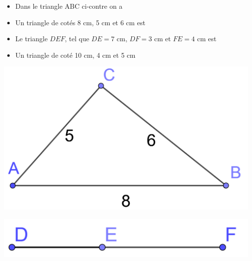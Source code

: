 \documentclass[12pt,a4paper]{article}
\date{}
\title{}
\begin{document}


%
%





\begin{myexs}
	\begin{multicols}{2}
		\begin{itemize}
			\item Dans le triangle ABC ci-contre on a %
			\item Un triangle de cotés 8 cm, 5 cm et 6 cm est %
			
			\item Le triangle $DEF$, tel que $DE = 7$ cm, $DF = 3$ cm et $FE = 4$ cm est  %
			\vspace*{1cm}
			\item Un triangle de coté 10 cm, 4 cm et 5 cm %
		\end{itemize}
		
		
		\begin{center}
			\includegraphics[scale=0.25]{triangle1}
			
			\includegraphics[scale=0.2]{triangle2}
		\end{center}
	\end{multicols}
\end{myexs}
\end{document}
